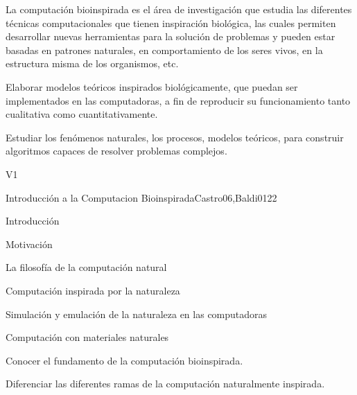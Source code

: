 \begin{syllabus}


\begin{justification}
La computación bioinspirada es el área de investigación que estudia
las diferentes técnicas computacionales que tienen inspiración
biológica, las cuales permiten desarrollar nuevas herramientas para
la solución de problemas y pueden estar basadas en patrones
naturales, en comportamiento de los seres vivos, en la estructura
misma de los organismos, etc. 
\end{justification}

\begin{goals}
\item Elaborar modelos teóricos inspirados biológicamente, que puedan ser implementados en las computadoras, a fin de reproducir su funcionamiento tanto cualitativa como cuantitativamente.
\item Estudiar los fenómenos naturales, los procesos, modelos teóricos, para construir algoritmos capaces de resolver problemas complejos.
\end{goals}

\begin{outcomes}{V1}
\end{outcomes}

\begin{unit}{Introducción a la Computacion Bioinspirada}{Castro06,Baldi01}{2}{2}
\begin{topics}
        \item Introducción
        \item Motivación
        \item La filosofía de la computación natural
        \item Computación inspirada por la naturaleza
        \item Simulación y emulación de la naturaleza en las computadoras
        \item Computación con materiales naturales
    \end{topics}
    \begin{learningoutcomes}
        \item Conocer el fundamento de la computación bioinspirada.
        \item Diferenciar las diferentes ramas de la computación naturalmente inspirada.
    \end{learningoutcomes}
\end{unit}


\end{syllabus}
